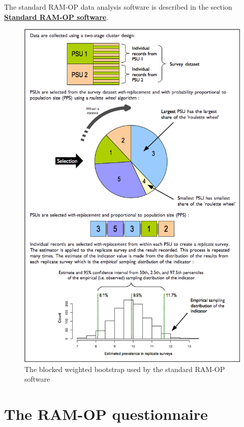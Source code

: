 \documentclass[12pt,a4paper]{book}
\theoremstyle{definition}
\theoremstyle{definition}
\theoremstyle{definition}
\theoremstyle{remark}
\begin{document}
The standard RAM-OP data analysis software is described in the section
\protect\hyperlink{software}{\textbf{Standard RAM-OP software}}.

\newpage

\begin{figure}[H]

{\centering \includegraphics[width=9.76in]{figures/bbw} 

}

\caption{The blocked weighted bootstrap used by the standard RAM-OP software}\label{fig:indicators31}
\end{figure}

\hypertarget{questionnaire}{%
\chapter{The RAM-OP questionnaire}\label{questionnaire}}
\end{document}
